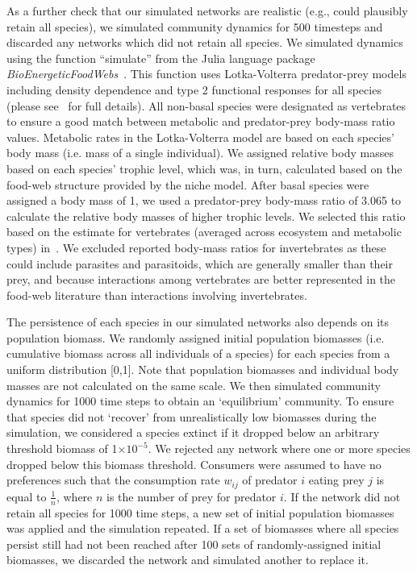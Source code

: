\documentclass[12pt]{article}
\begin{document}
\begin{spacing}{2.0}
        As a further check that our simulated networks are realistic (e.g., could plausibly retain all species), we simulated community dynamics for 500 timesteps and discarded any networks which did not retain all species. 
        We simulated dynamics using the function ``simulate'' from the Julia language package \emph{BioEnergeticFoodWebs}~\citep{bioenergeticfw,Delmas2017}.
        This function uses Lotka-Volterra predator-prey models including density dependence and type 2 functional responses for all species (please see~\citet{Delmas2017} for full details).
        All non-basal species were designated as vertebrates to ensure a good match between metabolic and predator-prey body-mass ratio values. Metabolic rates in the Lotka-Volterra model are based on each species' body mass (i.e. mass of a single individual). 
        We assigned relative body masses based on each species' trophic level, which was, in turn, calculated based on the food-web structure provided by the niche model. 
        After basal species were assigned a body mass of 1, we used a predator-prey body-mass ratio of 3.065 to calculate the relative body masses of higher trophic levels. 
        We selected this ratio based on the estimate for vertebrates (averaged across ecosystem and metabolic types) in~\citet{Brose2006}. 
        We excluded reported body-mass ratios for invertebrates as these could include parasites and parasitoids, which are generally smaller than their prey, and because interactions among vertebrates are better represented in the food-web literature than interactions involving invertebrates.
        
        
        The persistence of each species in our simulated networks also depends on its population biomass. 
        We randomly assigned initial population biomasses (i.e. cumulative biomass across all individuals of a species) for each species from a uniform distribution [0,1]. 
        Note that population biomasses and individual body masses are not calculated on the same scale. 
        We then simulated community dynamics for 1000 time steps to obtain an `equilibrium' community. 
        To ensure that species did not `recover' from unrealistically low biomasses during the simulation, we considered a species extinct if it dropped below an arbitrary threshold biomass of 1$\times10^{-5}$. 
        We rejected any network where one or more species dropped below this biomass threshold. 
        Consumers were assumed to have no preferences such that the consumption rate $w_{ij}$ of predator $i$ eating prey $j$ is equal to $\frac{1}{n}$, where $n$ is the number of prey for predator $i$. 
        If the network did not retain all species for 1000 time steps, a new set of initial population biomasses was applied and the simulation repeated.
        If a set of biomasses where all species persist still had not been reached after 100 sets of randomly-assigned initial biomasses, we discarded the network and simulated another to replace it.
        

\end{spacing}
\end{document}
